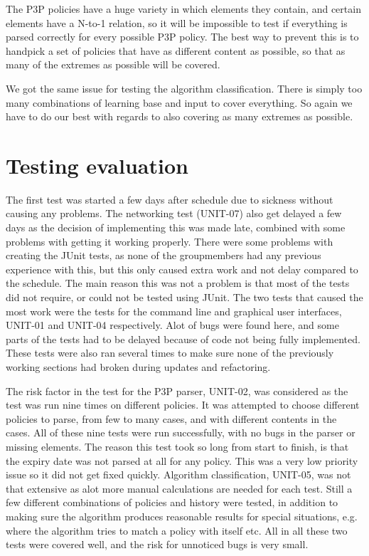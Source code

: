 The P3P policies have a huge variety in which elements they contain, and certain elements have a N-to-1 relation, so it will be impossible to test if everything is parsed correctly for every possible P3P policy. The best way to prevent this is to handpick a set of policies that have as different content as possible, so that as many of the extremes as possible will be covered.

We got the same issue for testing the algorithm classification. There is simply too many combinations of learning base and input to cover everything. So again we have to do our best with regards to also covering as many extremes as possible.

\section{Testing evaluation}
The first test was started a few days after schedule due to sickness without causing any problems. The networking test (UNIT-07) also get delayed a few days as the decision of implementing this was made late, combined with some problems with getting it working properly. There were  some problems with creating the JUnit tests, as none of the groupmembers had any previous experience with this, but this only caused extra work and not delay compared to the schedule. The main reason this was not a problem is that most of the tests did not require, or could not be tested using JUnit. The two tests that caused the most work were the tests for the command line and graphical user interfaces, UNIT-01 and UNIT-04 respectively. Alot of bugs were found here, and some parts of the tests had to be delayed because of code not being fully implemented. These tests were also ran several times to make sure none of the previously working sections had broken during updates and refactoring.

The risk factor in the test for the P3P parser, UNIT-02, was considered as the test was run nine times on different policies. It was attempted to choose different policies to parse, from few to many cases, and with different contents in the cases. All of these nine tests were run successfully, with no bugs in the parser or missing elements. The reason this test took so long from start to finish, is that the expiry date was not parsed at all for any policy. This was a very low priority issue so it did not get fixed quickly.
Algorithm classification, UNIT-05, was not that extensive as alot more manual calculations are needed for each test. Still a few different combinations of policies and history were tested, in addition to making sure the algorithm produces reasonable results for special situations, e.g. where the algorithm tries to match a policy with itself etc.
All in all these two tests were covered well, and the risk for unnoticed bugs is very small.
